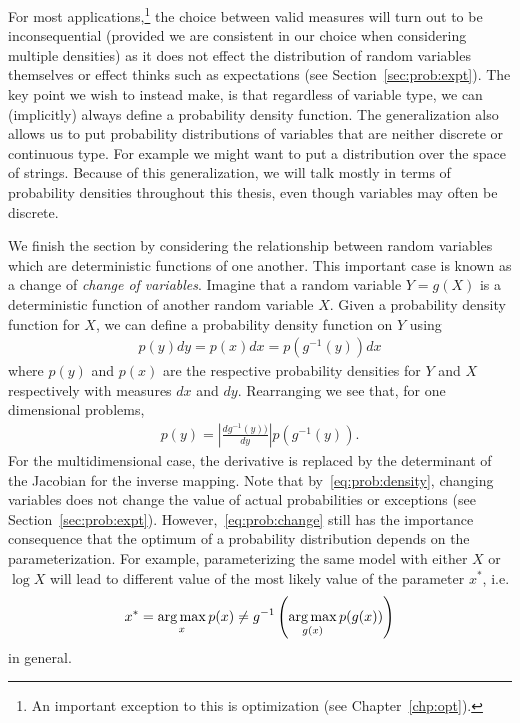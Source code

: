 For most applications,\footnote{An important
	exception to this is optimization (see Chapter~\ref{chp:opt}).}
the choice between valid measures will turn out to be
inconsequential (provided we are consistent in our choice when considering multiple
densities) as it does not effect the distribution of random variables themselves 
or effect thinks such as expectations (see Section~\ref{sec:prob:expt}).  
The key point we wish to instead make, is that regardless of variable type, we can
(implicitly) always define a probability density function.  The generalization also allows us
to put probability distributions of variables that are neither discrete or continuous type.
For example we might want to put a distribution over the space of strings.  
Because of this generalization, we will talk mostly in terms of probability densities throughout
this thesis, even though variables may often be discrete.

We finish the section by considering the relationship between random variables which
are deterministic functions of one another.  This important case is known as a change of
\emph{change of variables}.  Imagine
that a random variable $Y=g(X)$ is a deterministic function of another random variable $X$.
Given a probability density function for $X$, we can define a probability density function
on $Y$ using
\begin{align}
\label{eq:prob:change}
p(y)dy = p(x)dx = p(g^{-1}(y))dx
\end{align} 
where $p(y)$ and $p(x)$ are the respective probability densities for $Y$ and $X$
respectively with measures $dx$ and $dy$.  Rearranging we see that, for one dimensional problems, 
\begin{align}
\label{eq:prob:change2}
p(y) = \left|\frac{dg^{-1}(y))}{dy}\right|p(g^{-1}(y)).
\end{align}
For the multidimensional case, the derivative is replaced by the determinant of the
Jacobian for the inverse mapping.  Note that by~\eqref{eq:prob:density}, changing
variables does not change the value of actual probabilities or exceptions (see
 Section~\ref{sec:prob:expt}).  However,~\eqref{eq:prob:change}
still has the importance consequence that the optimum of a probability distribution
depends on the parameterization.  For example, parameterizing the same model with
either $X$ or $\log X$ will lead to different value of the most likely value of the parameter
$x^*$, i.e.
\begin{align}
x^* = \operatorname*{arg\,max}_{x} p(x) \neq g^{-1} \left(\operatorname*{arg\,max}_{g(x)} p(g(x))\right)
\end{align}
in general.

